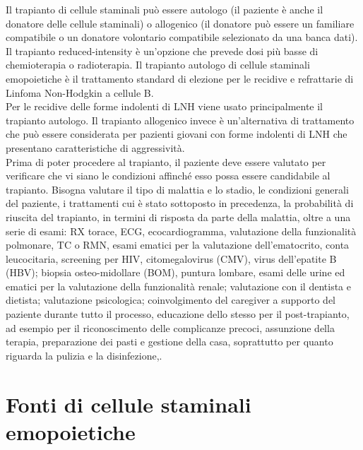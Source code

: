 Il trapianto di cellule staminali può essere autologo (il paziente è anche il donatore delle cellule staminali) 
o allogenico (il donatore può essere un familiare compatibile o un donatore volontario compatibile selezionato da una 
banca dati). Il trapianto reduced-intensity è un’opzione che prevede dosi più basse di chemioterapia o radioterapia\cite{LLS}.
Il trapianto autologo di cellule staminali emopoietiche è il trattamento standard di elezione per le recidive e 
refrattarie di Linfoma Non-Hodgkin a cellule B\cite{TRANS}.\\
Per le recidive delle forme indolenti di LNH viene usato principalmente il trapianto autologo. Il trapianto 
allogenico invece è un’alternativa di trattamento che può essere considerata per pazienti giovani con forme 
indolenti di LNH che presentano caratteristiche di aggressività\cite{LLS}.\\
Prima di poter procedere al trapianto, il paziente deve essere valutato per verificare che vi siano le condizioni 
affinché esso possa essere candidabile al trapianto. 
Bisogna valutare il tipo di malattia e lo stadio, le condizioni generali del paziente, i trattamenti cui è stato 
sottoposto in precedenza, la probabilità di riuscita del trapianto, in termini di risposta da parte della malattia, 
oltre a una serie di esami: RX torace, ECG, ecocardiogramma, valutazione della funzionalità polmonare, TC o RMN, 
esami ematici per la valutazione dell’ematocrito, conta leucocitaria, screening per HIV, citomegalovirus (CMV), 
virus dell’epatite B (HBV); biopsia osteo-midollare (BOM), puntura lombare, esami delle urine ed ematici per la 
valutazione della funzionalità renale; valutazione con il dentista e dietista; valutazione psicologica; 
coinvolgimento del caregiver a supporto del paziente durante tutto il processo, educazione dello stesso per il 
post-trapianto, ad esempio per il riconoscimento delle complicanze precoci, assunzione della terapia, preparazione 
dei pasti e gestione della casa, soprattutto per quanto riguarda la pulizia e la disinfezione\cite{LLS},\cite{STEMCELLS}.\\

\section{Fonti di cellule staminali emopoietiche}

